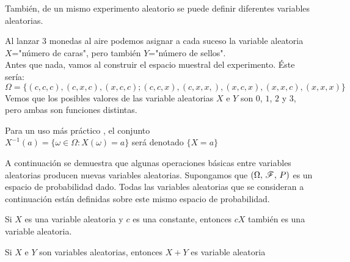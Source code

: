 También, de un mismo experimento aleatorio se puede definir diferentes variables aleatorias.
\begin{Ejm}
    Al lanzar 3 monedas al aire podemos asignar a cada suceso la variable aleatoria $X$="número de caras", pero también $Y$="número de sellos". \\
    Antes que nada, vamos al construir el espacio muestral del experimento. Éste sería:
    $$\Omega = \{(c,c,c), (c,x,c), (x,c,c); (c,c,x), (c,x,x,), (x,c,x), (x,x,c), (x,x,x)\}$$
    Vemos que los posibles valores de las variable aleatorias $X$ e $Y$ son $0$, $1$, $2$ y $3$, pero ambas son funciones distintas.
\end{Ejm}
\begin{Obs}
    Para un uso más práctico , el conjunto\\ $X^{-1}({a})=\{\omega\in\Omega: X(\omega)=a\}$
    será denotado $\{X= a\}$\\
\end{Obs}
A continuación se demuestra que algunas operaciones básicas entre variables aleatorias producen nuevas variables aleatorias. Supongamos que $(\Omega,\thinspace \mathscr{F},\thinspace P)$ es un espacio de probabilidad dado. Todas las variables aleatorias que se consideran a continuación están definidas sobre este mismo espacio
de probabilidad.
\begin{Prop}
    Si $X$ es una variable aleatoria y $c$ es una constante, entonces $c X$ también es una variable aleatoria.
    \label{prop-variableAl-cXesVA}
\end{Prop}
\begin{Prop}
    Si $X$ e $Y$ son variables aleatorias, entonces $X+Y$ es variable aleatoria
    \label{prop-variableAl-X+YesVA}
\end{Prop}
\begin{comment}
\begin{Def}
    Sea los espacios de probabilidad $(\Omega_1,\thinspace\mathscr{F}_1,\thinspace P_1)$, $(\Omega_2,\thinspace\mathscr{F}_2,\thinspace P_2)$.
    Un vector aleatorio es una función $X:\Omega_1\rightarrow\Omega_2$ tal que para cualquier conjunto B en $\mathscr{F}_2$, se cumple que la imagen inversa $X^{-1}(B)$ es un elemento de $\mathscr{F}_1$.
\end{Def}
Dado entonces que un vector aleatorio es una función de $\Omega$ en $\R^n$, éste
puede representar de la forma $X=(X_1,\ldots, X_n)$ en donde cada coordenada es una función de $\Omega$ en $\R$.
\begin{Prop}
    Una función $(X_1 , . . . , X_n):\Omega\rightarrow R^n$ es un vector aleatorio si, y sólo si, cada coordenada es una variable aleatoria.
\end{Prop}
El resultado es análogo al caso unidimensional y puede extenderse al caso de $n$ dimensiones.
En la mayoría de los casos, las definiciones y resultados son fácilmente extendidos a dimensiones mayores.\\
\begin{Obs}
    El vector aleatorio $(A,\thinspace B)$ se interpreta cuan probable es que suceda A y B a la vez. Es decir $P(A,\thinspace B)=P(A\cap B)$.
\end{Obs}
\end{comment}


